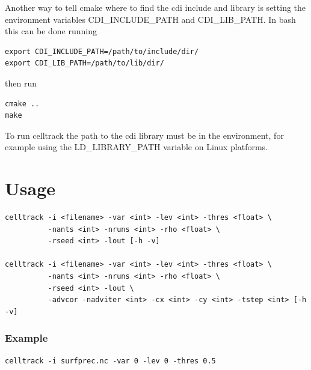 \documentclass{scrartcl}
\begin{document}
Another way to tell cmake where to find the cdi include and library is setting the environment variables CDI\_INCLUDE\_PATH and CDI\_LIB\_PATH. In bash this can be done running
\begin{verbatim}
export CDI_INCLUDE_PATH=/path/to/include/dir/
export CDI_LIB_PATH=/path/to/lib/dir/
\end{verbatim}
then run
\begin{verbatim}
cmake ..
make
\end{verbatim}
To run celltrack the path to the cdi library must be in the environment, for example using the LD\_LIBRARY\_PATH variable on Linux platforms.

\section{Usage}
\begin{verbatim}
celltrack -i <filename> -var <int> -lev <int> -thres <float> \
          -nants <int> -nruns <int> -rho <float> \
          -rseed <int> -lout [-h -v]
          
celltrack -i <filename> -var <int> -lev <int> -thres <float> \
          -nants <int> -nruns <int> -rho <float> \
          -rseed <int> -lout \
          -advcor -nadviter <int> -cx <int> -cy <int> -tstep <int> [-h -v]
\end{verbatim}

\subsubsection*{Example}
\begin{verbatim}
celltrack -i surfprec.nc -var 0 -lev 0 -thres 0.5
\end{verbatim}
\end{document}
